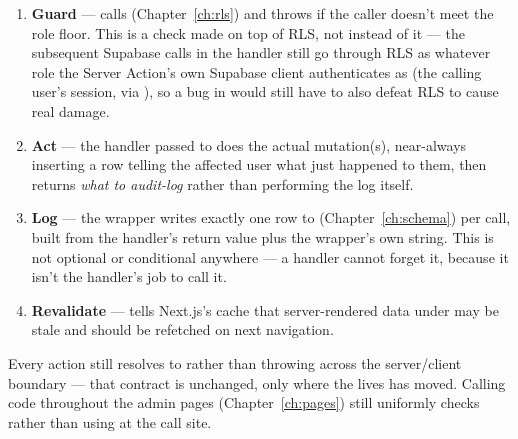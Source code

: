 \begin{enumerate}
  \item \textbf{Guard} —  calls  (Chapter~\ref{ch:rls}) and throws if the caller doesn't meet the role floor. This is a check made on top of RLS, not instead of it — the subsequent Supabase calls in the handler still go through RLS as whatever role the Server Action's own Supabase client authenticates as (the calling user's session, via ), so a bug in  would still have to also defeat RLS to cause real damage.
  \item \textbf{Act} — the handler passed to  does the actual mutation(s), near-always inserting a  row telling the affected user what just happened to them, then returns \emph{what to audit-log} rather than performing the log itself.
  \item \textbf{Log} — the wrapper writes exactly one row to  (Chapter~\ref{ch:schema}) per call, built from the handler's return value plus the wrapper's own  string. This is not optional or conditional anywhere — a handler cannot forget it, because it isn't the handler's job to call it.
  \item \textbf{Revalidate} —  tells Next.js's cache that server-rendered data under  may be stale and should be refetched on next navigation.
\end{enumerate}

\begin{olktip}
Every action still resolves to  rather than throwing across the server/client boundary — that contract is unchanged, only where the  lives has moved. Calling code throughout the admin pages (Chapter~\ref{ch:pages}) still uniformly checks  rather than using  at the call site.
\end{olktip}

